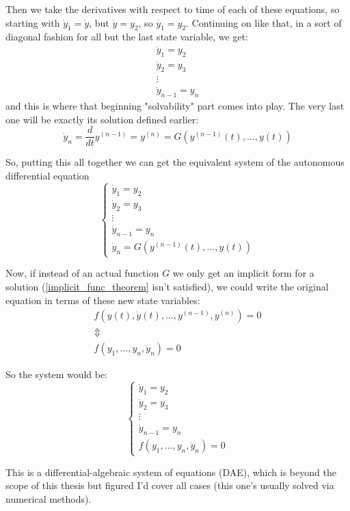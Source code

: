 Then we take the derivatives with respect to time of each of these equations, so starting with $\dot{y}_1 = \dot{y}$, but $\dot{y} = y_2$, so $\dot{y_1}=y_2$. Continuing on like that, in a sort of diagonal fashion for all but the last state variable, we get:
\begin{gather*}
  \dot{y}_1 = y_2 \\
  \dot{y}_2 = y_3 \\
  \vdots \\
  \dot{y}_{n-1} = y_n
\end{gather*}
and this is where that beginning "solvability" part comes into play. The very last one will be exactly its solution defined earlier:
\[
  \dot{y}_n = \frac{d}{dt}y^{(n-1)} = y^{(n)}  = G(y^{(n-1)}(t), \dots, y(t))
\]

So, putting this all together we can get the equivalent system of the autonomous differential equation
\[
  \begin{cases}
    \dot{y}_1 = y_2     \\
    \dot{y}_2 = y_3     \\
    \vdots              \\
    \dot{y}_{n-1} = y_n \\
    \dot{y}_n  = G(y^{(n-1)}(t), \dots, y(t))
  \end{cases}
\]

Now, if instead of an actual function $G$ we only get an implicit form for a solution (\ref{implicit_func_theorem} isn't satisfied), we could write the original equation in terms of these new state variables:
\begin{gather*}
  f(y(t), \dot{y}(t),\dots,y^{(n-1)},y^{(n)})= 0 \\
  \Updownarrow \\
  f(y_1,\dots,y_n,\dot{y}_n) = 0
\end{gather*}

So the system would be:
\[
  \begin{cases}
    \dot{y}_1 = y_2     \\
    \dot{y}_2 = y_3     \\
    \vdots              \\
    \dot{y}_{n-1} = y_n \\
    f(y_1,\dots,y_n,\dot{y}_n) = 0
  \end{cases}
\]

This is a differential-algebraic system of equations (DAE), which is beyond the scope of this thesis but figured I'd cover all cases (this one's usually solved via numerical methods).

